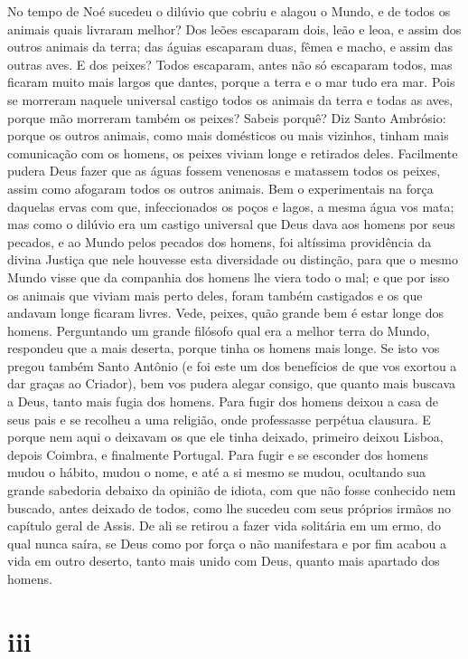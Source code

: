 No tempo de Noé sucedeu o dilúvio que cobriu e alagou o Mundo, e de
todos os animais quais livraram melhor? Dos leões escaparam dois, leão e
leoa, e assim dos outros animais da terra; das águias escaparam duas,
fêmea e macho, e assim das outras aves. E dos peixes? Todos escaparam,
antes não só escaparam todos, mas ficaram muito mais largos que dantes,
porque a terra e o mar tudo era mar. Pois se morreram naquele universal
castigo todos os animais da terra e todas as aves, porque mão morreram
também os peixes? Sabeis porquê? Diz Santo Ambrósio: porque os outros
animais, como mais domésticos ou mais vizinhos, tinham mais comunicação
com os homens, os peixes viviam longe e retirados deles. Facilmente
pudera Deus fazer que as águas fossem venenosas e matassem todos os
peixes, assim como afogaram todos os outros animais. Bem o experimentais
na força daquelas ervas com que, infeccionados os poços e lagos, a mesma
água vos mata; mas como o dilúvio era um castigo universal que Deus dava
aos homens por seus pecados, e ao Mundo pelos pecados dos homens, foi
altíssima providência da divina Justiça que nele houvesse esta
diversidade ou distinção, para que o mesmo Mundo visse que da companhia
dos homens lhe viera todo o mal; e que por isso os animais que viviam
mais perto deles, foram também castigados e os que andavam longe ficaram
livres.
Vede, peixes, quão grande bem é estar longe dos homens. Perguntando um
grande filósofo qual era a melhor terra do Mundo, respondeu que a mais
deserta, porque tinha os homens mais longe. Se isto vos pregou também
Santo Antônio (e foi este um dos benefícios de que vos exortou a dar
graças ao Criador), bem vos pudera alegar consigo, que quanto mais
buscava a Deus, tanto mais fugia dos
homens. Para fugir dos homens deixou a casa de seus pais e se recolheu a
uma religião, onde professasse perpétua clausura. E porque nem aqui o
deixavam os que ele tinha deixado, primeiro deixou Lisboa, depois
Coimbra, e finalmente Portugal. Para fugir e se esconder dos homens
mudou o hábito, mudou o nome, e até a si mesmo se mudou, ocultando sua
grande sabedoria debaixo da opinião de idiota, com que não fosse
conhecido nem buscado, antes deixado de todos, como lhe sucedeu com seus
próprios irmãos no capítulo geral de Assis. De ali se retirou a fazer
vida solitária em um ermo, do qual nunca saíra, se Deus como por força o
não manifestara e por fim acabou a vida em outro deserto, tanto mais
unido com Deus, quanto mais apartado dos homens.

\section*{iii}

